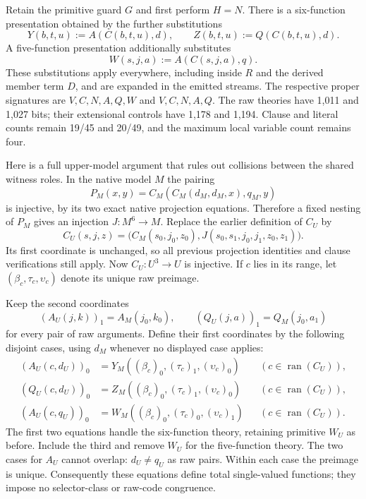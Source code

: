 Retain the primitive guard $G$ and first perform $H=N$. There is a
six-function presentation obtained by the further substitutions
\[
 Y(b,t,u):=A(C(b,t,u),d),\qquad
 Z(b,t,u):=Q(C(b,t,u),d).
\]
A five-function presentation additionally substitutes
\[
 W(s,j,a):=A(C(s,j,a),q).
\]
These substitutions apply everywhere, including inside $R$ and the
derived member term $D$, and are expanded in the emitted streams.
The respective proper signatures are $V,C,N,A,Q,W$ and $V,C,N,A,Q$.
The raw theories have 1,011 and 1,027 bits; their extensional controls
have 1,178 and 1,194. Clause and literal counts remain 19/45 and
20/49, and the maximum local variable count remains four.

Here is a full upper-model argument that rules out collisions between
the shared witness roles. In the native model $M$ the pairing
\[
 P_M(x,y)=C_M(C_M(d_M,d_M,x),q_M,y)
\]
is injective, by its two exact native projection equations. Therefore
a fixed nesting of $P_M$ gives an injection $J:M^6\to M$. Replace the
earlier definition of $C_U$ by
\[
 C_U(s,j,z)=
 \bigl(C_M(s_0,j_0,z_0),
       J(s_0,s_1,j_0,j_1,z_0,z_1)\bigr).
\]
Its first coordinate is unchanged, so all previous projection
identities and clause verifications still apply. Now $C_U:U^3\to U$
is injective. If $c$ lies in its range, let
$(\beta_c,\tau_c,\upsilon_c)$ denote its unique raw preimage.

Keep the second coordinates
\[
 (A_U(j,k))_1=A_M(j_0,k_0),\qquad
 (Q_U(j,a))_1=Q_M(j_0,a_1)
\]
for every pair of raw arguments. Define their first coordinates by
the following disjoint cases, using $d_M$ whenever no displayed case
applies:
\begin{align*}
 (A_U(c,d_U))_0
   &=Y_M((\beta_c)_0,(\tau_c)_1,(\upsilon_c)_0)
       &&(c\in\operatorname{ran}(C_U)),\\
 (Q_U(c,d_U))_0
   &=Z_M((\beta_c)_0,(\tau_c)_1,(\upsilon_c)_0)
       &&(c\in\operatorname{ran}(C_U)),\\
 (A_U(c,q_U))_0
   &=W_M((\beta_c)_0,(\tau_c)_0,(\upsilon_c)_1)
       &&(c\in\operatorname{ran}(C_U)).
\end{align*}
The first two equations handle the six-function theory, retaining
primitive $W_U$ as before. Include the third and remove $W_U$ for the
five-function theory. The two cases for $A_U$ cannot overlap:
$d_U\ne q_U$ as raw pairs. Within each case the preimage is unique.
Consequently these equations define total single-valued functions;
they impose no selector-class or raw-code congruence.

